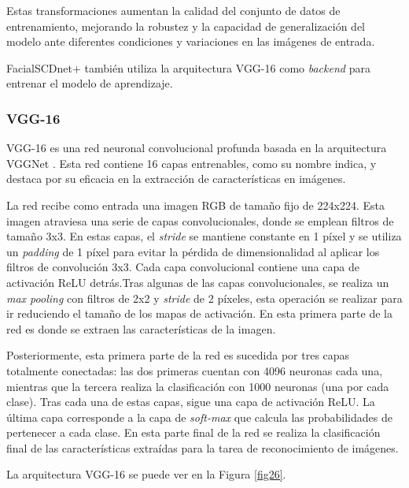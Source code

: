 Estas transformaciones aumentan la calidad del conjunto de datos de entrenamiento, mejorando la robustez y la capacidad de generalización del modelo ante diferentes condiciones y variaciones en las imágenes de entrada.

FacialSCDnet+ también utiliza la arquitectura VGG-16 como \textit{backend} para entrenar el modelo de aprendizaje.

\subsubsection{VGG-16}

VGG-16 es una red neuronal convolucional profunda basada en la arquitectura VGGNet \cite{65}. Esta red contiene 16 capas entrenables, como su nombre indica, y destaca por su eficacia en la extracción de características en imágenes.

La red recibe como entrada una imagen RGB de tamaño fijo de 224x224. Esta imagen atraviesa una serie de capas convolucionales, donde se emplean filtros de tamaño 3x3. En estas capas, el \textit{stride} se mantiene constante en 1 píxel y se utiliza un \textit{padding} de 1 píxel para evitar la pérdida de dimensionalidad al aplicar los filtros de convolución 3x3. Cada capa convolucional contiene una capa de activación ReLU detrás.Tras algunas de las capas convolucionales, se realiza un \textit{max pooling} con filtros de 2x2 y \textit{stride} de 2 píxeles, esta operación se realizar para ir reduciendo el tamaño de los mapas de activación. En esta primera parte de la red es donde se extraen las características de la imagen.

Posteriormente, esta primera parte de la red es sucedida por tres capas totalmente conectadas: las dos primeras cuentan con 4096 neuronas cada una, mientras que la tercera realiza la clasificación con 1000 neuronas (una por cada clase). Tras cada una de estas capas, sigue una capa de activación ReLU. La última capa corresponde a la capa de \textit{soft-max} que calcula las probabilidades de pertenecer a cada clase. En esta parte final de la red se realiza la clasificación final de las características extraídas para la tarea de reconocimiento de imágenes.

La arquitectura VGG-16 se puede ver en la Figura \ref{fig26}.

